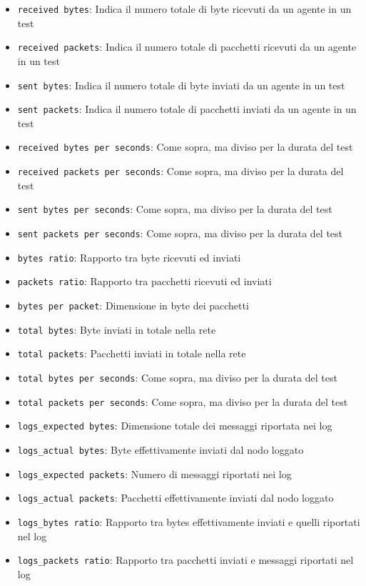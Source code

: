 \documentclass[target=bach]{thud}
\begin{document}
\begin{itemize}
    \item \lstinline{received bytes}: Indica il numero totale di byte ricevuti da un agente in un test
    \item \lstinline{received packets}: Indica il numero totale di pacchetti ricevuti da un agente in un test
    \item \lstinline{sent bytes}: Indica il numero totale di byte inviati da un agente in un test
    \item \lstinline{sent packets}: Indica il numero totale di pacchetti inviati da un agente in un test
    \item \lstinline{received bytes per seconds}: Come sopra, ma diviso per la durata del test
    \item \lstinline{received packets per seconds}: Come sopra, ma diviso per la durata del test
    \item \lstinline{sent bytes per seconds}: Come sopra, ma diviso per la durata del test
    \item \lstinline{sent packets per seconds}: Come sopra, ma diviso per la durata del test
    \item \lstinline{bytes ratio}: Rapporto tra byte ricevuti ed inviati
    \item \lstinline{packets ratio}: Rapporto tra pacchetti ricevuti ed inviati
    \item \lstinline{bytes per packet}: Dimensione in byte dei pacchetti
    \item \lstinline{total bytes}: Byte inviati in totale nella rete
    \item \lstinline{total packets}: Pacchetti inviati in totale nella rete
    \item \lstinline{total bytes per seconds}: Come sopra, ma diviso per la durata del test
    \item \lstinline{total packets per seconds}: Come sopra, ma diviso per la durata del test
    \item \lstinline{logs_expected bytes}: Dimensione totale dei messaggi riportata nei log
    \item \lstinline{logs_actual bytes}: Byte effettivamente inviati dal nodo loggato
    \item \lstinline{logs_expected packets}: Numero di messaggi riportati nei log
    \item \lstinline{logs_actual packets}: Pacchetti effettivamente inviati dal nodo loggato
    \item \lstinline{logs_bytes ratio}: Rapporto tra bytes effettivamente inviati e quelli riportati nel log
    \item \lstinline{logs_packets ratio}: Rapporto tra pacchetti inviati e messaggi riportati nel log
\end{itemize}
\end{document}
